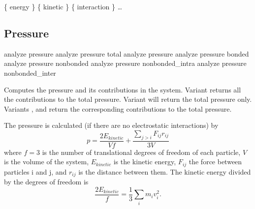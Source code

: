 \begin{code}
\{ energy  \} \{ kinetic  \} \{ interaction  \} \dots 
\end{code}

\subsection{Pressure}
\label{analyze:pressure}

\begin{essyntax}
   analyze pressure
   analyze pressure total
   analyze pressure 
   analyze pressure bonded 
   analyze pressure nonbonded  
   analyze pressure nonbonded_intra 
   analyze pressure nonbonded_inter 
\end{essyntax}

Computes the pressure and its contributions in the system. Variant
 returns all the contributions to the total pressure.
Variant  will return the total pressure only.  Variants
,  and  return the corresponding
contributions to the total pressure.



The pressure is calculated (if there are no electrostatic interactions) by 
\begin{equation}
\label{eq:ptens}
  p = \frac{2E_{kinetic}}{Vf} + \frac{\sum_{j>i} {F_{ij}r_{ij}}}{3V}
\end{equation}
where $f=3$ is the number of translational degrees of freedom of each particle, $V$
is the volume of the system, $E_{kinetic}$ is the kinetic energy, $F_{ij}$ the force between
particles i and j, and $r_{ij}$ is the distance between them.  The kinetic energy divided by the
degrees of freedom is
\begin{equation}
\frac{2E_{kinetic}}{f} = \frac{1}{3}\sum_{i} {m_{i}v_{i}^{2}}.
\end {equation}

